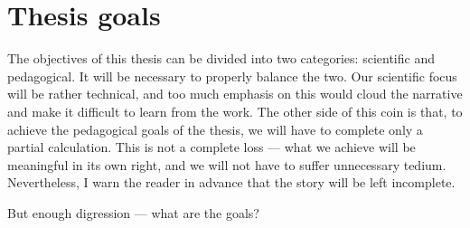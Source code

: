 \documentclass[../thesis.tex]{subfiles}
\begin{document}
\section{Thesis goals}
	The objectives of this thesis can be divided into two categories: scientific and pedagogical. It will be necessary to properly balance the two. Our scientific focus will be rather technical, and too much emphasis on this would cloud the narrative and make it difficult to learn from the work. The other side of this coin is that, to achieve the pedagogical goals of the thesis, we will have to complete only a partial calculation. This is not a complete loss --- what we achieve will be meaningful in its own right, and we will not have to suffer unnecessary tedium. Nevertheless, I warn the reader in advance that the story will be left incomplete.

	But enough digression --- what are the goals?
\end{document}

